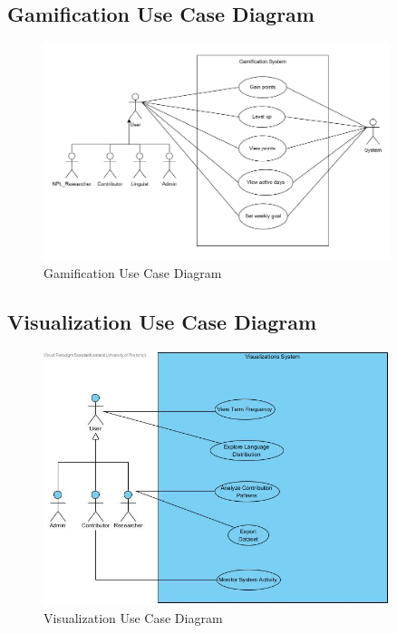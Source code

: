 \documentclass[12pt]{article}
\begin{document}
\subsection{Gamification Use Case Diagram}
\begin{figure}[H]
  \centering
  \includegraphics[width=0.9\textwidth]{gamification_new.PNG}
  \caption{Gamification Use Case Diagram}
  \label{fig:gamification-use-case}
\end{figure}

\subsection{Visualization Use Case Diagram}
\begin{figure}[H]
  \centering
  \includegraphics[width=0.9\textwidth]{Visualizations.jpg}
  \caption{Visualization Use Case Diagram}
  \label{fig:visualization-use-case}
\end{figure}
\end{document}
